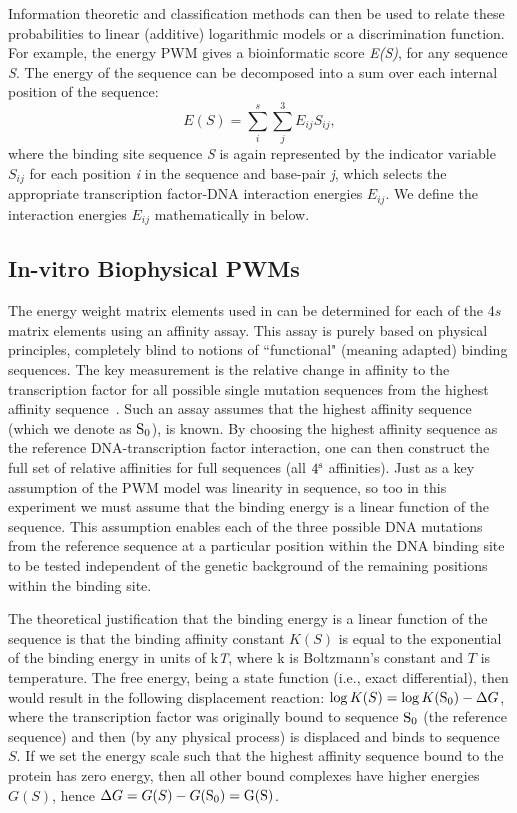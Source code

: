 Information theoretic and classification methods can then be used to relate these probabilities to linear (additive) logarithmic models or a discrimination function.  For example, the energy PWM gives a bioinformatic score \textit{E(S)}, for any sequence \textit{S}.  The energy of the sequence can be decomposed into a sum over each internal position of the sequence:
\begin{equation}\label{epwm}
E(S) =\sum_i^s \sum_j^3 E_{ij} S_{ij},
\end{equation}
where the binding site sequence \textit{S} is again represented by the indicator variable $S_{ij}$ for each position \textit{i} in the sequence and base-pair \textit{j}, which selects the appropriate transcription factor-DNA interaction energies $E_{ij}$.  We define the interaction energies $E_{ij}$ mathematically in  below.



\subsection{In-vitro Biophysical PWMs}
The energy weight matrix elements used in  can be determined for each of the 4$s$ matrix elements using an affinity assay.  This assay is purely based on physical principles, completely blind to notions of ``functional" (meaning adapted) binding sequences.  The key measurement is the relative change in affinity to the transcription factor for all possible single mutation sequences from the highest affinity sequence~\cite{pmid9581503,pmid8080080,hill,pmid20877328,pmid9268651}.  Such an assay assumes that the highest affinity sequence (which we denote as $\rm{S_0}$), is known.   By choosing the highest affinity sequence as the reference DNA-transcription factor interaction, one can then construct the full set of relative affinities for full sequences (all $4^{\rm s}$ affinities).  Just as a key assumption of the PWM model was linearity in sequence, so too in this experiment we must assume that the binding energy is a linear function of the sequence.  This assumption enables each of the three possible DNA mutations from the reference sequence at a particular position within the DNA binding site to be tested independent of the genetic background of the remaining positions within the binding site.


The theoretical justification that the binding energy is a linear function of the sequence is that the binding affinity constant $K(S)$ is equal to the exponential of the binding energy in units of k\textit{T}, where k is Boltzmann's constant and $T$ is temperature.  The free energy, being a state function (i.e., exact differential), then would result in the following displacement reaction: $\log{K(S)} = \log{K(\rm{S_0})} -\Delta G$, where the transcription factor was originally bound to sequence $\rm{S_0}$ (the reference sequence) and then (by any physical process) is displaced and binds to sequence $S$.  If we set the energy scale such that the highest affinity sequence bound to the protein has zero energy, then all other bound complexes have higher energies $G(S)$, hence $\Delta G = G(S)-G(\rm{S_0}) = G(S)$.

